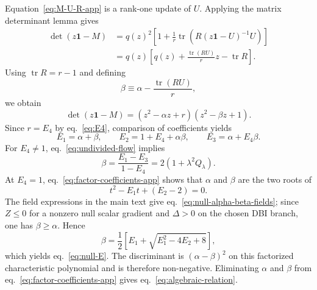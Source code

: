 \documentclass[a4paper,11pt]{article}
\numberwithin{equation}{section}
\newcommand{\tr}{\operatorname{tr}}
\newcommand{\Id}{\mathbf 1}
\begin{document}
Equation~\eqref{eq:M-U-R-app} is a rank-one update of $U$. Applying the matrix determinant lemma gives
\begin{align}
 \det(z\Id-M)
 &=q(z)^2\left[1+\frac1r\tr\!\left(R(z\Id-U)^{-1}U\right)\right]\nonumber\\
 &=q(z)\left[q(z)+\frac{\tr(RU)}{r}z-\tr R\right].
 \label{eq:char-factor-intermediate-app}
\end{align}
Using $\tr R=r-1$ and defining
\begin{equation}
 \beta\equiv\alpha-\frac{\tr(RU)}{r},
\end{equation}
we obtain
\begin{equation}
 \det(z\Id-M)
 =(z^2-\alpha z+r)(z^2-\beta z+1).
 \label{eq:char-factor-app}
\end{equation}
Since $r=E_4$ by eq.~\eqref{eq:E4}, comparison of coefficients yields
\begin{equation}
 E_1=\alpha+\beta,
 \qquad
 E_2=1+E_4+\alpha\beta,
 \qquad
 E_3=\alpha+E_4\beta.
 \label{eq:factor-coefficients-app}
\end{equation}
For $E_4\neq1$, eq.~\eqref{eq:undivided-flow} implies
\begin{equation}
 \beta=\frac{E_1-E_3}{1-E_4}=2(1+\lambda^2Q_\lambda).
 \label{eq:beta-app}
\end{equation}
At $E_4=1$, eq.~\eqref{eq:factor-coefficients-app} shows that $\alpha$ and $\beta$ are the two roots of
\begin{equation}
 t^2-E_1t+(E_2-2)=0.
\end{equation}
The field expressions in the main text give eq.~\eqref{eq:null-alpha-beta-fields}; since $Z\leq0$ for a nonzero null scalar gradient and $\Delta>0$ on the chosen DBI branch, one has $\beta\geq\alpha$. Hence
\begin{equation}
 \beta=\frac12\left[E_1+\sqrt{E_1^2-4E_2+8}\right],
\end{equation}
which yields eq.~\eqref{eq:null-E}. The discriminant is $(\alpha-\beta)^2$ on this factorized characteristic polynomial and is therefore non-negative. Eliminating $\alpha$ and $\beta$ from eq.~\eqref{eq:factor-coefficients-app} gives eq.~\eqref{eq:algebraic-relation}.
\end{document}
